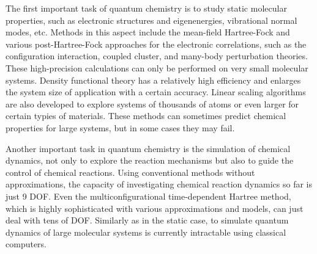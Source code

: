 \documentclass[8.5pt,twoside,twocolumn]{article}
\begin{document}
The first important task of quantum chemistry is to
study static molecular properties, such as
electronic structures and eigenenergies,
vibrational normal modes, etc.
Methods in this aspect include the mean-field
Hartree-Fock and various post-Hartree-Fock approaches
for the electronic correlations,
such as the configuration interaction,
coupled cluster, and many-body perturbation
theories.\cite{Hydrogen}
These high-precision calculations can only be
performed on very small molecular systems.
Density functional theory\cite{Parr95,Kohn96,Chelikowsky09}
has a relatively high efficiency and enlarges the system size
of application with a certain accuracy.
Linear scaling algorithms\cite{Hung09, Goedecker99} are also
developed to explore systems of thousands of atoms or even larger
for certain typies of materials.
These methods can sometimes predict chemical properties
for large systems, but in some cases they may fail.\cite{Yang08,limit_1,limit_2,limit_3}

Another important task in quantum chemistry is
the simulation of chemical dynamics,
not only to explore the reaction mechanisms
but also to guide the control of
chemical reactions.\cite{Reaction_1,Reaction_2}
Using conventional methods without approximations,
the capacity of investigating chemical reaction dynamics
so far is just 9 DOF.\cite{DOF}
Even the multiconfigurational time-dependent
Hartree method,\cite{Hartree} which is highly sophisticated
with various approximations and models,
can just deal with tens of DOF.
Similarly as in the static case,
to simulate quantum dynamics of large molecular systems
is currently intractable using classical computers.
\end{document}
